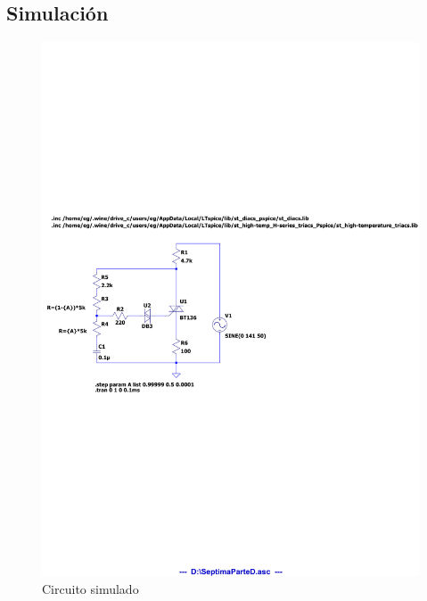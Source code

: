 \subsection{Simulación}
\begin{figure}[H]
  \begin{center}
    \includegraphics[width=\textwidth, clip, trim=0 10cm 8cm 11cm]{inc/sim/SeptimaParte.pdf}
  \end{center}
  \caption{Circuito simulado}\label{fig:}
\end{figure}

